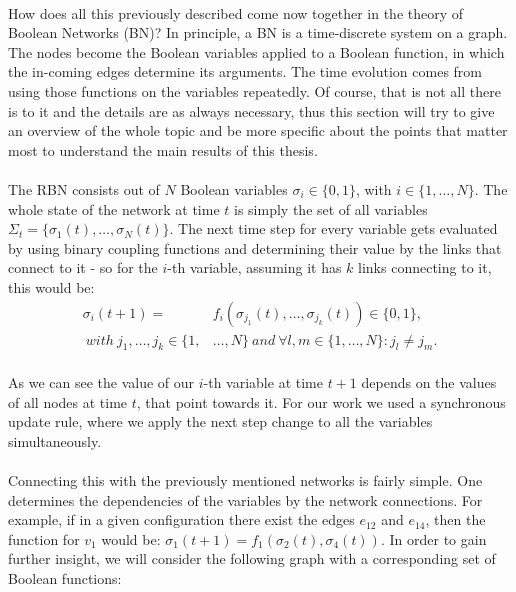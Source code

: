 \paragraph*{}
How does all this previously described come now together in the theory of Boolean Networks (BN)? In principle, a BN is a time-discrete system on a graph. The nodes become the Boolean variables applied to a Boolean function, in which the in-coming edges determine its arguments. The time evolution comes from using those functions on the variables repeatedly. Of course, that is not all there is to it and the details are as always necessary, thus this section will try to give an overview of the whole topic and be more specific about the points that matter most to understand the main results of this thesis.

\paragraph*{}
The RBN consists out of $N$ Boolean variables $ \sigma_i \in \{0,1\} $, with $ i \in \{1,\dots, N\} $. The whole state of the network at time $ t $ is simply the set of all variables $ \Sigma_t = \{ \sigma_1(t),\dots,\sigma_N(t)\}$. The next time step for every variable gets evaluated by using binary coupling functions and determining their value by the links that connect to it - so for the $ i $-th variable, assuming it has $k$ links connecting to it, this would be:
\begin{align}
\sigma_i(t+1)=&f_i(\sigma_{j_1}(t),\dots,\sigma_{j_k}(t))\in \{0,1\},\\
\ with\ j_1, \dots, j_k \in \{1,&\dots,N\}\ and\ \forall l,m \in\{1,\dots,N\}:j_l\neq j_m.
\end{align}

\paragraph*{}
As we can see the value of our $ i $-th variable at time $ t+1 $ depends on the values of all nodes at time $ t $, that point towards it. For our work we used a synchronous update rule, where we apply the next step change to all the variables simultaneously. 

\paragraph*{}
Connecting this with the previously mentioned networks is fairly simple. One determines the dependencies of the variables by the network connections. For example, if in a given configuration there exist the edges $ e_{12} $ and $ e_{14} $, then the function for $ v_1 $ would be: $ \sigma_1(t+1) = f_1(\sigma_2(t),\sigma_4(t)) $. In order to gain further insight, we will consider the following graph with a corresponding set of Boolean functions:

